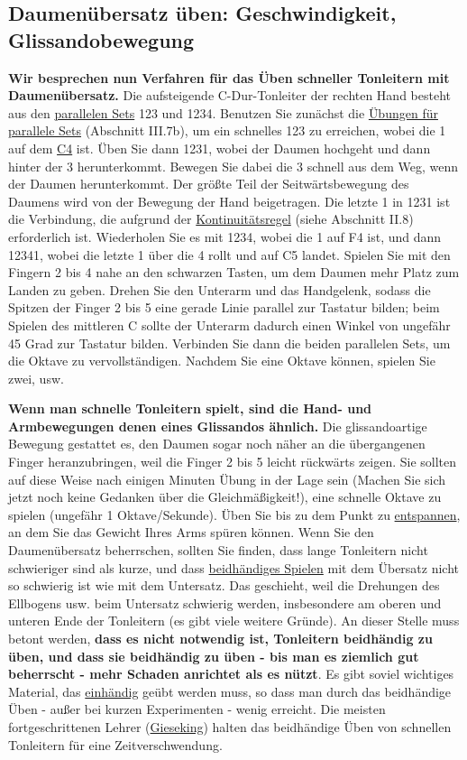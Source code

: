 
\hypertarget{c1iii5a2}{}
\subsection{Daumenübersatz üben: Geschwindigkeit, Glissandobewegung}\hypertarget{c1iii5c}{}

\textbf{Wir besprechen nun Verfahren für das Üben schneller Tonleitern mit Daumenübersatz.}
Die aufsteigende C-Dur-Tonleiter der rechten Hand besteht aus den \hyperlink{c1iv2}{parallelen Sets} 123 und 1234.
Benutzen Sie zunächst die \hyperlink{c1iii7b}{Übungen für parallele Sets} (Abschnitt III.7b), um ein schnelles 123 zu erreichen, wobei die 1 auf dem \hyperlink{Noten}{C4} ist.
Üben Sie dann 1231, wobei der Daumen hochgeht und dann hinter der 3 herunterkommt.
Bewegen Sie dabei die 3 schnell aus dem Weg, wenn der Daumen herunterkommt.
Der größte Teil der Seitwärtsbewegung des Daumens wird von der Bewegung der Hand beigetragen.
Die letzte 1 in 1231 ist die Verbindung, die aufgrund der \hyperlink{c1ii8}{Kontinuitätsregel} (siehe Abschnitt II.8) erforderlich ist.
Wiederholen Sie es mit 1234, wobei die 1 auf F4 ist, und dann 12341, wobei die letzte 1 über die 4 rollt und auf C5 landet.
Spielen Sie mit den Fingern 2 bis 4 nahe an den schwarzen Tasten, um dem Daumen mehr Platz zum Landen zu geben.
Drehen Sie den Unterarm und das Handgelenk, sodass die Spitzen der Finger 2 bis 5 eine gerade Linie parallel zur Tastatur bilden; beim Spielen des mittleren C sollte der Unterarm dadurch einen Winkel von ungefähr 45 Grad zur Tastatur bilden.
Verbinden Sie dann die beiden parallelen Sets, um die Oktave zu vervollständigen.
Nachdem Sie eine Oktave können, spielen Sie zwei, usw.

\textbf{Wenn man schnelle Tonleitern spielt, sind die Hand- und Armbewegungen denen eines Glissandos ähnlich.}
Die glissandoartige Bewegung gestattet es, den Daumen sogar noch näher an die übergangenen Finger heranzubringen, weil die Finger 2 bis 5 leicht rückwärts zeigen.
Sie sollten auf diese Weise nach einigen Minuten Übung in der Lage sein (Machen Sie sich jetzt noch keine Gedanken über die Gleichmäßigkeit!), eine schnelle Oktave zu spielen (ungefähr 1 Oktave/Sekunde).
Üben Sie bis zu dem Punkt zu \hyperlink{c1ii14}{entspannen}, an dem Sie das Gewicht Ihres Arms spüren können.
Wenn Sie den Daumenübersatz beherrschen, sollten Sie finden, dass lange Tonleitern nicht schwieriger sind als kurze, und dass \hyperlink{c1ii25}{beidhändiges Spielen} mit dem Übersatz nicht so schwierig ist wie mit dem Untersatz.
Das geschieht, weil die Drehungen des Ellbogens usw. beim Untersatz schwierig werden, insbesondere am oberen und unteren Ende der Tonleitern (es gibt viele weitere Gründe).
An dieser Stelle muss betont werden, \textbf{dass es nicht notwendig ist, Tonleitern beidhändig zu üben, und dass sie beidhändig zu üben - bis man es ziemlich gut beherrscht - mehr Schaden anrichtet als es nützt}.
Es gibt soviel wichtiges Material, das \hyperlink{c1ii7}{einhändig} geübt werden muss, so dass man durch das beidhändige Üben - außer bei kurzen Experimenten - wenig erreicht.
Die meisten fortgeschrittenen Lehrer (\hyperlink{Gieseking}{Gieseking}) halten das beidhändige Üben von schnellen Tonleitern für eine Zeitverschwendung.

